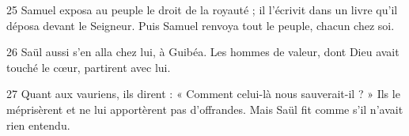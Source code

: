 
25 Samuel exposa au peuple le droit de la royauté ; il l’écrivit dans un livre qu’il déposa devant le Seigneur. Puis Samuel renvoya tout le peuple, chacun chez soi.

26 Saül aussi s’en alla chez lui, à Guibéa. Les hommes de valeur, dont Dieu avait touché le cœur, partirent avec lui.

27 Quant aux vauriens, ils dirent : « Comment celui-là nous sauverait-il ? » Ils le méprisèrent et ne lui apportèrent pas d’offrandes. Mais Saül fit comme s’il n’avait rien entendu.